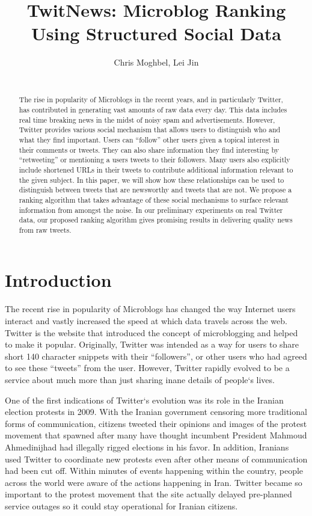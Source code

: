 \documentclass[10pt]{proc}
\title{\bf TwitNews: Microblog Ranking Using Structured Social Data}
\author{\alignauthor Chris Moghbel, Lei Jin \\
\affaddr{Dept. of Computer Science, UCLA} \\
\email{cmoghbel@cs.ucla.edu, rickyjin@cs.ucla.edu}
}
\begin{document}
  
\maketitle

\begin{abstract} 
The rise in popularity of Microblogs in the recent years, and in particularly Twitter, has contributed in generating vast amounts of raw data every day. This data includes real time breaking news in the midst of noisy spam and advertisements.  However, Twitter provides various social mechanism that allows users to distinguish who and what they find important. Users can ``follow'' other users given a topical interest in their comments or tweets.  They can also share information they find interesting by ``retweeting'' or mentioning a users tweets to their followers.  Many users also explicitly include shortened URLs in their tweets to contribute additional information relevant to the given subject.  In this paper, we will show how these relationships can be used to distinguish between tweets that are newsworthy and tweets that are not.  We propose a ranking algorithm that takes advantage of these social mechanisms to surface relevant information from amongst the noise.  In our preliminary experiments on real Twitter data, our proposed ranking algorithm gives promising results in delivering quality news from raw tweets.
\end{abstract} 

\section{Introduction}
The recent rise in popularity of Microblogs has changed the way Internet users interact and vastly increased the speed at which data travels across the web. Twitter is the website that introduced the concept of microblogging and helped to make it popular. Originally, Twitter was intended as a way for users to share short 140 character snippets with their ``followers'', or other users who had agreed to see these ``tweets'' from the user. However, Twitter rapidly evolved to be a service about much more than just sharing inane details of people`s lives.

One of the first indications of Twitter`s evolution was its role in the Iranian election protests in 2009. With the Iranian government censoring more traditional forms of communication, citizens tweeted their opinions and images of the protest movement that spawned after many have thought incumbent President Mahmoud Ahmedinijhad had illegally rigged elections in his favor. In addition, Iranians used Twitter to coordinate new protests even after other means of communication had been cut off. Within minutes of events happening within the country, people across the world were aware of the actions happening in Iran. Twitter became so important to the protest movement that the site actually delayed pre-planned service outages so it could stay operational for Iranian citizens.
\end{document}
